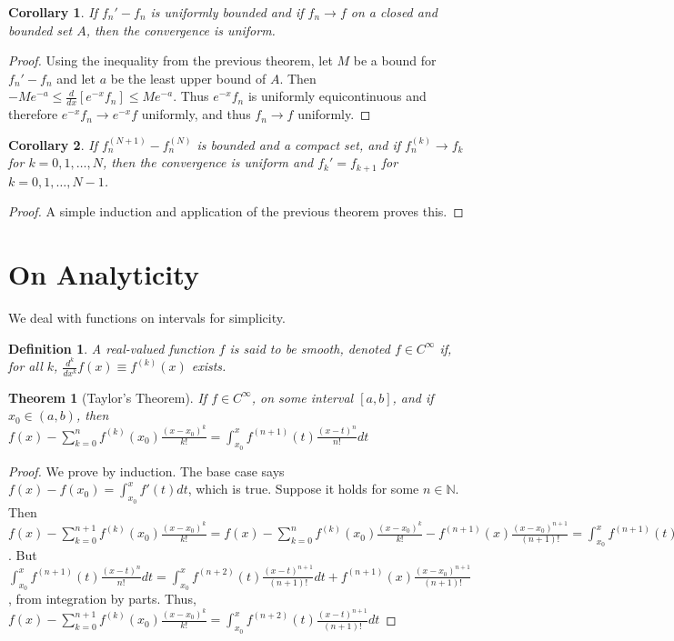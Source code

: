 \documentclass[oneside]{book}
\theoremstyle{mystyle}
\newtheorem{theorem}{Theorem}[section]
\newtheorem{definition}{Definition}[section]
\newtheorem{corollary}{Corollary}[section]
\begin{document}
\begin{corollary}
If $f_n' - f_n$ is uniformly bounded and if $f_n \rightarrow f$ on a closed and bounded set $A$, then the convergence is uniform.
\end{corollary}
\begin{proof}
Using the inequality from the previous theorem, let $M$ be a bound for $f_n'-f_n$ and let $a$ be the least upper bound of $A$. Then $-Me^{-a}\leq \frac{d}{dx}[e^{-x}f_n] \leq Me^{-a}$. Thus $e^{-x}f_n$ is uniformly equicontinuous and therefore $e^{-x}f_n\rightarrow e^{-x}f$ uniformly, and thus $f_n\rightarrow f$ uniformly.
\end{proof}

\begin{corollary}
If $f_n^{(N+1)}-f_n^{(N)}$ is bounded and a compact set, and if $f_n^{(k)}\rightarrow f_k$ for $k=0,1,\hdots, N$, then the convergence is uniform and $f_{k}' = f_{k+1}$ for $k=0,1,\hdots,N-1$.
\end{corollary}
\begin{proof}
A simple induction and application of the previous theorem proves this.
\end{proof}
%
\section{On Analyticity}
%
We deal with functions on intervals for simplicity.
%
\begin{definition}
A real-valued function $f$ is said to be smooth, denoted $f\in C^{\infty}$ if, for all $k$, $\frac{d^k}{dx^k}f(x) \equiv f^{(k)}(x)$ exists.
\end{definition}

\begin{theorem}[Taylor's Theorem]
If $f\in C^{\infty}$, on some interval $[a,b]$, and if $x_0\in (a,b)$, then $f(x) - \sum_{k=0}^{n} f^{(k)}(x_0)\frac{(x-x_0)^k}{k!} = \int_{x_0}^{x} f^{(n+1)}(t)\frac{(x-t)^n}{n!}dt$
\end{theorem}
\begin{proof}
We prove by induction. The base case says $f(x)-f(x_0) = \int_{x_0}^{x} f'(t)dt$, which is true. Suppose it holds for some $n\in \mathbb{N}$. Then $f(x)-\sum_{k=0}^{n+1} f^{(k)}(x_0)\frac{(x-x_0)^k}{k!} = f(x)-\sum_{k=0}^{n} f^{(k)}(x_0)\frac{(x-x_0)^k}{k!} - f^{(n+1)}(x)\frac{(x-x_0)^{n+1}}{(n+1)!} = \int_{x_0}^{x} f^{(n+1)}(t)\frac{(x-t)^n}{n!}dt - f^{(n+1)}(x)\frac{(x-x_0)^{n+1}}{(n+1)!}$. But $\int_{x_0}^{x} f^{(n+1)}(t)\frac{(x-t)^n}{n!}dt =  \int_{x_0}^{x} f^{(n+2)}(t) \frac{(x-t)^{n+1}}{(n+1)!} dt + f^{(n+1)}(x)\frac{(x-x_0)^{n+1}}{(n+1)!}$, from integration by parts. Thus, $f(x)-\sum_{k=0}^{n+1} f^{(k)}(x_0)\frac{(x-x_0)^k}{k!}= \int_{x_0}^{x} f^{(n+2)}(t) \frac{(x-t)^{n+1}}{(n+1)!} dt$
\end{proof}
\end{document}
